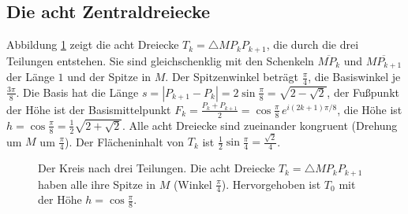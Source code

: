 \documentclass[a4paper,12pt,twoside]{report}
\theoremstyle{definition}
\begin{document}
\subsection{Die acht Zentraldreiecke}
\label{sec:ok:dreiecke}

Abbildung \ref{ok:fig:achtel} zeigt die acht Dreiecke $T_k=\triangle MP_kP_{k+1}$, die durch die drei Teilungen entstehen. Sie sind gleichschenklig mit den Schenkeln $\overline{MP_k}$ und $\overline{MP_{k+1}}$ der Länge $1$ und der Spitze in $M$. Der Spitzenwinkel beträgt $\frac\pi4$, die Basiswinkel je $\frac{3\pi}{8}$. Die Basis hat die Länge $s=|P_{k+1}-P_k|=2\sin\frac\pi8=\sqrt{2-\sqrt2}$, der Fußpunkt der Höhe ist der Basismittelpunkt $F_k=\frac{P_k+P_{k+1}}2=\cos\frac\pi8\,e^{i(2k+1)\pi/8}$, die Höhe ist $h=\cos\frac\pi8=\frac12\sqrt{2+\sqrt2}$. Alle acht Dreiecke sind zueinander kongruent (Drehung um $M$ um $\frac\pi4$). Der Flächeninhalt von $T_k$ ist $\frac12\sin\frac\pi4=\frac{\sqrt2}{4}$.

\begin{figure}[htbp]
\centering
{}
\caption{Der Kreis nach drei Teilungen. Die acht Dreiecke $T_k=\triangle MP_kP_{k+1}$ haben alle ihre Spitze in $M$ (Winkel $\frac\pi4$). Hervorgehoben ist $T_0$ mit der Höhe $h=\cos\frac\pi8$.}
\label{ok:fig:achtel}
\end{figure}
\end{document}
